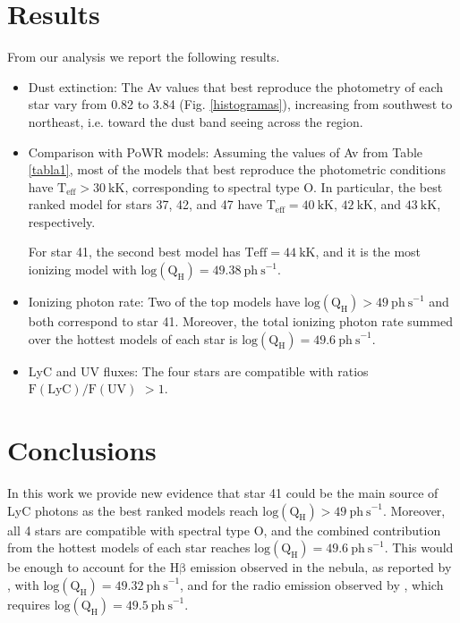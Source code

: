 \documentclass[baaa]{baaa}
\begin{document}
\section{Results}
 From our analysis we report the following results.
\begin{itemize}
 \item Dust extinction: The Av values that best reproduce the photometry of each star vary from 0.82 to 3.84 (Fig. \ref{histogramas}), increasing from southwest to northeast, i.e.  toward the dust band seeing across the region.
 \item Comparison with PoWR models: Assuming the values of Av from Table \ref{tabla1}, most of the models that best reproduce the photometric conditions have $\mathrm{T_{eff}} > 30 ~\mathrm{kK}$, corresponding to spectral type O. In particular, the best ranked model for stars 37, 42, and 47 have $\mathrm{T_{eff}} = 40 ~\mathrm{kK}$, $42 ~\mathrm{kK}$, and $43 ~\mathrm{kK}$, respectively.

  For star 41, the second best model has $\mathrm{Teff}=44 ~\mathrm{kK}$, and it is the most ionizing model with $\mathrm{log(Q_H)} = 49.38 ~\mathrm{ ph\ s}^{-1}$.
 \item Ionizing photon rate:  Two of the top models have $\mathrm{log(Q_H)} > 49  ~\mathrm{ph\ s}^{-1}$ and both correspond to star 41. Moreover, the total ionizing photon rate
 summed over the hottest models of each star is $\mathrm{log(Q_H)} = 49.6~\mathrm{ph\ s}^{-1}$.
 \item LyC and UV fluxes:  The four stars are compatible with ratios $\mathrm{F(LyC)/F(UV)}$  $>1$. 
\end{itemize}

\section{Conclusions}

In this work we provide new evidence that star 41 could be the main source of LyC photons as the best ranked models reach $\mathrm{log(Q_H)} > 49 ~\mathrm{ph\ s}^{-1}$. Moreover, all 4 stars are compatible with spectral type O, and the combined contribution from the hottest models of each star reaches $\mathrm{log(Q_H)} = 49.6 ~\mathrm{ph\ s}^{-1}$.
This would be enough to account for the $\mathrm{H\beta}$ emission observed in the nebula, as reported by \citet{hm1999_n88}, with $\mathrm{log(Q_H)}= 49.32 ~\mathrm{ph\ s}^{-1}$, and for the radio emission observed by \citet{Indebetouw2004}, which requires $\mathrm{log(Q_H)}= 49.5 ~\mathrm{ph\ s}^{-1}$.
\end{document}

